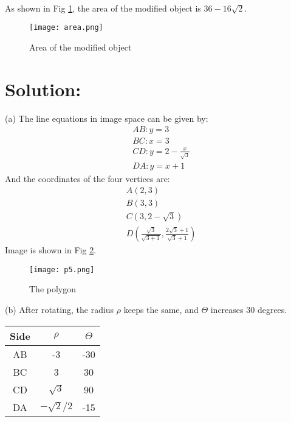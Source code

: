 \documentclass[12pt]{article}
\begin{document}
\noindent \\
As shown in Fig \ref{area}, the area of the modified object is $36 - 16\sqrt{2}$.
\begin{figure}[H]
\centering
\texttt{[image: area.png]}
\caption{Area of the modified object}
\label{area}
\end{figure}
\section{Solution:}
(a) The line equations in image space can be given by:
\begin{equation*}
\begin{aligned}
&AB: y=3\\
&BC: x=3\\
&CD: y=2-\frac{x}{\sqrt{3}}\\
&DA: y=x+1
\end{aligned}
\end{equation*}
And the coordinates of the four vertices are:
\begin{equation*}
\begin{aligned}
&A (2, 3)\\
&B (3, 3)\\
&C  (3, 2-\sqrt{3})\\
&D (\frac{\sqrt{3}}{\sqrt{3+1}}, \frac{2\sqrt{3}+1}{\sqrt{3}+1})
\end{aligned}
\end{equation*}
Image is shown in Fig \ref{polygon}.
\begin{figure}[H]
\centering
\texttt{[image: p5.png]}
\caption{The polygon}
\label{polygon}
\end{figure}

(b) After rotating, the radius $\rho$ keeps the same, and \textbf{$\Theta$} increases $30$ degrees.
\begin{table*}[h]
\centering
\begin{tabular}{|c|c|c|}
\hline
\textbf{Side}&$\rho$& \textbf{$\Theta$}\\
\hline
AB & -3 & -30\\
BC & 3 & 30 \\
CD & $\sqrt{3}$ & 90\\
DA & $-\sqrt{2}/2$ & -15\\
\hline
\end{tabular}
\end{table*}
\end{document}
